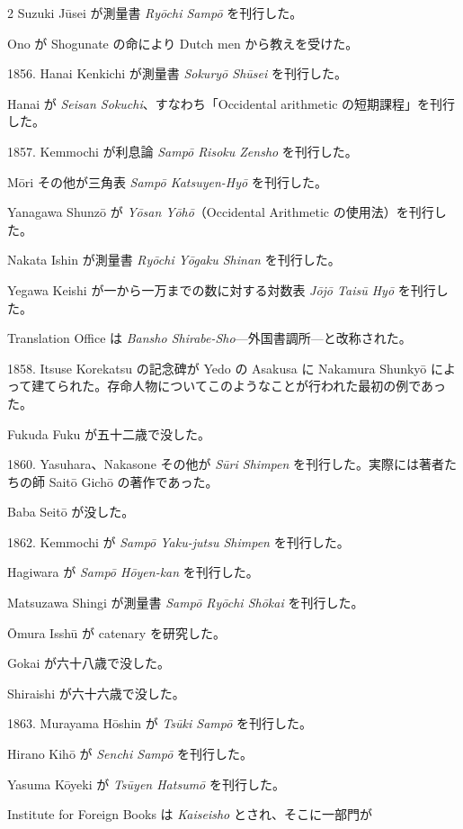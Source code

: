 \documentclass[11pt]{article}
\newcommand{\scanfooter}{}
\begin{document}
\begin{multicols}{2}
\columnbreak
Suzuki Jūsei が測量書 \emph{Ryōchi Sampō} を刊行した。

Ono が Shogunate の命により Dutch men から教えを受けた。

1856. Hanai Kenkichi が測量書 \emph{Sokuryō Shūsei} を刊行した。

Hanai が \emph{Seisan Sokuchi}、すなわち「Occidental arithmetic の短期課程」を刊行した。

1857. Kemmochi が利息論 \emph{Sampō Risoku Zensho} を刊行した。

Mōri その他が三角表 \emph{Sampō Katsuyen-Hyō} を刊行した。

Yanagawa Shunzō が \emph{Yōsan Yōhō}（Occidental Arithmetic の使用法）を刊行した。

Nakata Ishin が測量書 \emph{Ryōchi Yōgaku Shinan} を刊行した。

Yegawa Keishi が一から一万までの数に対する対数表 \emph{Jōjō Taisū Hyō} を刊行した。

Translation Office は \emph{Bansho Shirabe-Sho}---外国書調所---と改称された。

1858. Itsuse Korekatsu の記念碑が Yedo の Asakusa に Nakamura Shunkyō によって建てられた。存命人物についてこのようなことが行われた最初の例であった。

Fukuda Fuku が五十二歳で没した。

1860. Yasuhara、Nakasone その他が \emph{Sūri Shimpen} を刊行した。実際には著者たちの師 Saitō Gichō の著作であった。

Baba Seitō が没した。

1862. Kemmochi が \emph{Sampō Yaku-jutsu Shimpen} を刊行した。

Hagiwara が \emph{Sampō Hōyen-kan} を刊行した。

Matsuzawa Shingi が測量書 \emph{Sampō Ryōchi Shōkai} を刊行した。

Ōmura Isshū が catenary を研究した。

Gokai が六十八歳で没した。

Shiraishi が六十六歳で没した。

1863. Murayama Hōshin が \emph{Tsūki Sampō} を刊行した。

Hirano Kihō が \emph{Senchi Sampō} を刊行した。

Yasuma Kōyeki が \emph{Tsūyen Hatsumō} を刊行した。

Institute for Foreign Books は \emph{Kaiseisho} とされ、そこに一部門が
\end{multicols}
\scanfooter
\end{document}
